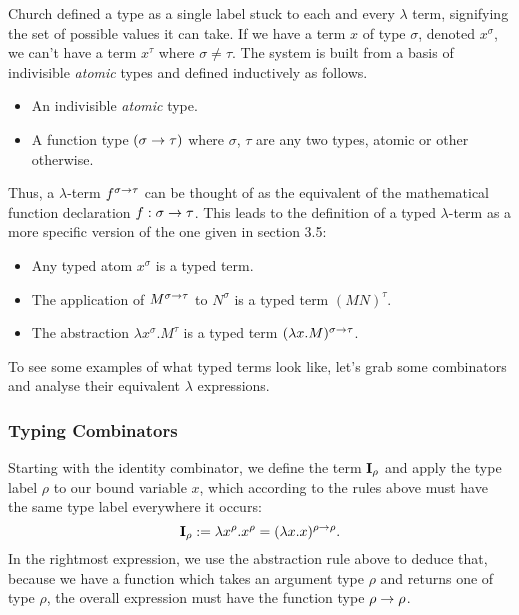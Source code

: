 Church defined a type as a single label stuck to each and every $\lambda$ term, signifying the set of possible values it can take. If we have a term $x$ of type $\sigma$, denoted $x^\sigma$, we can't have a term $x^\tau$ where $\sigma\not=\tau$. The system is built from a basis of indivisible {\it atomic} types and defined inductively as follows.
\begin{itemize}
    \item An indivisible {\it atomic} type.
    \item A function type $(\sigma\rightarrow\tau)$ where $\sigma$, $\tau$ are any two types, atomic or other otherwise.
\end{itemize}
Thus, a $\lambda$-term $f^{\sigma\rightarrow\tau}$ can be thought of as the equivalent of the mathematical function declaration $f: \sigma\rightarrow\tau$. This leads to the definition of a typed $\lambda$-term as a more specific version of the one given in section 3.5:
\begin{itemize}
    \item Any typed atom $x^\sigma$ is a typed term.
    \item The application of $M^{\sigma\rightarrow\tau}$ to $N^\sigma$ is a typed term $(MN)^\tau$.
    \item The abstraction $\lambda x^\sigma.M^\tau$ is a typed term $(\lambda x.M)^{\sigma\rightarrow\tau}$.
\end{itemize}
To see some examples of what typed terms look like, let's grab some combinators and analyse their equivalent $\lambda$ expressions.

\subsubsection{Typing Combinators}

Starting with the identity combinator, we define the term $\textbf I_\rho$ and apply the type label $\rho$ to our bound variable $x$, which according to the rules above must have the same type label everywhere it occurs:
\begin{equation}
    \textbf I_\rho:=\lambda x^\rho.x^\rho=(\lambda x.x)^{\rho\rightarrow\rho}.
\end{equation}
In the rightmost expression, we use the abstraction rule above to deduce that, because we have a function which takes an argument type $\rho$ and returns one of type $\rho$, the overall expression must have the function type $\rho\rightarrow\rho$.


